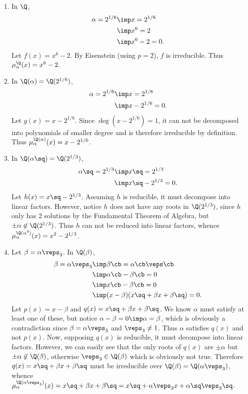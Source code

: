 \documentclass{article}
\begin{document}
\begin{solution}
\begin{enumerate}[label=\alph*)]
\item In $ \Q $, \begin{align*}
  \alpha = 2^{1/6} &\imp x = 2^{1/6}\\
  &\imp x^6 = 2 \\
  &\imp x^6 - 2 = 0.
\end{align*}
Let $ f(x) = x^6-2 $.
By Eisenstein (using $ p=2 $), $ f $ is irreducible.
Thus $ \mu_\alpha^\Q (x) = x^6 - 2 $.

\item In $ \Q(\alpha)=\Q(2^{1/6}) $, \begin{align*}
  \alpha = 2^{1/6} &\imp x=2^{1/6} \\
  &\imp x - 2^{1/6} = 0.
\end{align*}
Let $ g(x) = x-2^{1/6} $.
Since $ \deg(x-2^{1/6}) = 1 $, it can not be decomposed into  polynomials of smaller degree and is therefore irreducible by definition.
Thus $ \mu_\alpha^{\Q(\alpha)} (x) = x - 2^{1/6} $.

\item In $ \Q(\alpha\sq)=\Q(2^{1/3}) $, \begin{align*}
  \alpha\sq = 2^{1/3} &\imp x\sq = 2^{1/3} \\
  &\imp x\sq - 2^{1/3} = 0.
\end{align*}
Let $ h(x) = x\sq-2^{1/3} $. Assuming $ h $ is reducible, it must decompose into linear factors.
However, notice $ h $ does not have any roots in $ \Q(2^{1/3}) $, since $ h $ only has 2 solutions by the Fundamental Theorem of Algebra, but $ \pm\alpha\not\in \Q(2^{1/3}) $.
Thus $ h $ can not be reduced into linear factors, whence $ \mu_\alpha^{\Q(\alpha^2)}(x) = x^2-2^{1/3} $.

\item Let $ \beta=\alpha\veps_3 $. In $ \Q(\beta) $, \begin{align*}
  \beta = \alpha\veps_3 &\imp \beta\cb = \alpha\cb \veps\cb \\
  &\imp \alpha\cb - \beta\cb = 0 \\
  &\imp x\cb - \beta\cb = 0 \\
  &\imp (x-\beta)(x\sq+\beta x + \beta\sq) = 0.
\end{align*}
Let $ p(x) = x-\beta $ and $ q(x) = x\sq+\beta x + \beta\sq $.
We know $ \alpha $ must satisfy at least one of these, but notice $ \alpha-\beta = 0 \imp \alpha = \beta $, which is obviously a contradiction since $ \beta=\alpha\veps_3 $ and $ \veps_3 \neq 1 $.
Thus $ \alpha $ satisfies $ q(x) $ and not $ p(x) $. Now, supposing $ q(x) $ is reducible, it must decompose into linear factors.
However, we can easily see that the only roots of $ q(x) $ are $ \pm \alpha$ but $ \pm\alpha\not\in \Q(\beta) $, otherwise $ \veps_3 \in \Q(\beta) $ which is obviously not true.
Therefore $ q(x) =  x\sq+\beta x + \beta\sq $ must be irreducible over $ \Q(\beta) = \Q(\alpha\veps_3) $, whence $ \mu_\alpha^{\Q(\alpha\veps_3)}(x) =  x\sq+\beta x + \beta\sq = x\sq+\alpha\veps_3x + \alpha\sq\veps_3\sq$.
\end{enumerate}
\end{solution}
\end{document}
